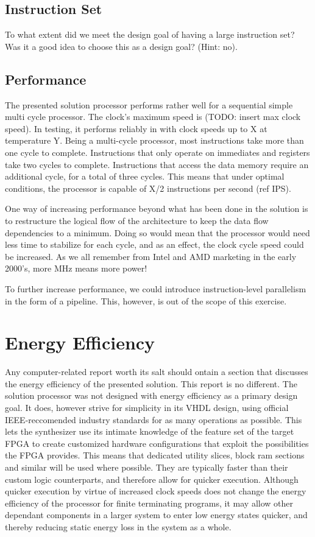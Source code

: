 \subsection{Instruction Set}

To what extent did we meet the design goal of having a large instruction set?
Was it a good idea to choose this as a design goal? (Hint: no).

\subsection{Performance}

The presented solution processor performs rather well for a sequential simple multi cycle processor.
The clock's maximum speed is (TODO: insert max clock speed).
In testing, it performs reliably in with clock speeds up to X at temperature Y.
Being a multi-cycle processor, most instructions take more than one cycle to complete.
Instructions that only operate on immediates and registers take two cycles to complete.
Instructions that access the data memory require an additional cycle, for a total of three cycles.
This means that under optimal conditions, the processor is capable of X/2 instructions per second (ref IPS).

One way of increasing performance beyond what has been done in the solution is to restructure the logical flow of the architecture to keep the data flow dependencies to a minimum.
Doing so would mean that the processor would need less time to stabilize for each cycle, and as an effect, the clock cycle speed could be increased.
As we all remember from Intel and AMD marketing in the early 2000's, more MHz means more power!

To further increase performance, we could introduce instruction-level parallelism in the form of a pipeline.
This, however, is out of the scope of this exercise.

\section{Energy Efficiency}

Any computer-related report worth its salt should ontain a section that discusses the energy efficiency of the presented solution.
This report is no different.
The solution processor was not designed with energy efficiency as a primary design goal.
It does, however strive for simplicity in its VHDL design, using official IEEE-reccomended industry standards for as many operations as possible.
This lets the synthesizer use its intimate knowledge of the feature set of the target FPGA to create customized hardware configurations that exploit the possibilities the FPGA provides.
This means that dedicated utility slices, block ram sections and similar will be used where possible.
They are typically faster than their custom logic counterparts, and therefore allow for quicker execution.
Although quicker execution by virtue of increased clock speeds does not change the energy efficiency of the processor for finite terminating programs, it may allow other dependant components in a larger system to enter low energy states quicker, and thereby reducing static energy loss in the system as a whole.

